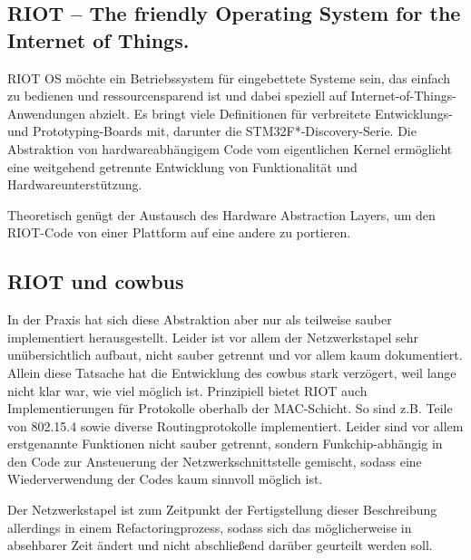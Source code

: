 \documentclass{IEEEtran}
\begin{document}
    \subsection{RIOT -- The friendly Operating System for the Internet of Things.\cite{RIOT}}
        RIOT OS möchte ein Betriebssystem für eingebettete Systeme sein,
        das einfach zu bedienen und ressourcensparend ist und dabei speziell
        auf Internet-of-Things-Anwendungen abzielt. Es bringt viele Definitionen
        für verbreitete Entwicklungs- und Prototyping-Boards mit, darunter die
        STM32F*-Discovery-Serie.
        Die Abstraktion von hardwareabhängigem Code vom eigentlichen Kernel
        ermöglicht eine weitgehend getrennte Entwicklung von Funktionalität und
        Hardwareunterstützung.

        Theoretisch genügt der Austausch des Hardware Abstraction Layers,
        um den RIOT-Code von einer Plattform auf eine andere zu portieren.

    \subsection{RIOT und cowbus}
        In der Praxis hat sich diese Abstraktion aber nur als teilweise sauber
        implementiert herausgestellt. Leider ist vor allem der Netzwerkstapel
        sehr unübersichtlich aufbaut, nicht sauber getrennt und vor allem kaum
        dokumentiert. Allein diese Tatsache hat die Entwicklung des cowbus stark
        verzögert, weil lange nicht klar war, wie viel möglich ist.
        Prinzipiell bietet RIOT auch Implementierungen für Protokolle oberhalb
        der MAC-Schicht. So sind z.B. Teile von 802.15.4 sowie diverse
        Routingprotokolle implementiert. Leider sind vor allem erstgenannte
        Funktionen nicht sauber getrennt, sondern Funkchip-abhängig in den
        Code zur Ansteuerung der Netzwerkschnittstelle gemischt, sodass eine
        Wiederverwendung der Codes kaum sinnvoll möglich ist.

        Der Netzwerkstapel ist zum Zeitpunkt der Fertigstellung dieser
        Beschreibung allerdings in einem Refactoringprozess,
        sodass sich das möglicherweise in absehbarer Zeit ändert und nicht
        abschließend darüber geurteilt werden soll.
\end{document}
